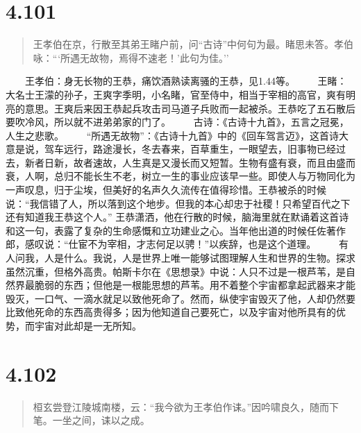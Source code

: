 \documentclass[]{book}
\begin{document}
\section{4.101}\label{section-276}

\begin{quote}
王孝伯在京，行散至其弟王睹户前，问``古诗''中何句为最。睹思未答。孝伯咏：```所遇无故物，焉得不速老！'此句为佳。''
\end{quote}

　　王孝伯：身无长物的王恭，痛饮酒熟读离骚的王恭，见1.44等。
　　王睹：大名士王濛的孙子，王爽字季明，小名睹，官至侍中，相当于宰相的高官，爽有明亮的意思。王爽后来因王恭起兵攻击司马道子兵败而一起被杀。王恭吃了五石散后要吹冷风，所以就不进弟弟家的门了。
　　古诗：《古诗十九首》，五言之冠冕，人生之悲歌。
　　``所遇无故物''：《古诗十九首》中的《回车驾言迈》，这首诗大意是说，驾车远行，路途漫长，冬去春来，百草重生，一眼望去，旧事物已经过去，新者日新，故者速故，人生真是又漫长而又短暂。生物有盛有衰，而且由盛而衰，人啊，总归不能长生不老，树立一生的事业应该早一些。即使人与万物同化为一声叹息，归于尘埃，但美好的名声久久流传在值得珍惜。王恭被杀的时候说：``我信错了人，所以落到这个地步。但我的本心却忠于社稷！只希望百代之下还有知道我王恭这个人。''
王恭潇洒，他在行散的时候，脑海里就在默诵着这首诗和这一句，表露了复杂的生命感慨和立功建业之心。当年他出道的时候任佐著作郎，感叹说：``仕宦不为宰相，才志何足以骋！''以疾辞，也是这个道理。
　　有人问我，人是什么。我说，人是世界上唯一能够试图理解人生和世界的生物。探求虽然沉重，但格外高贵。帕斯卡尔在《思想录》中说：人只不过是一根芦苇，是自然界最脆弱的东西；但他是一根能思想的芦苇。用不着整个宇宙都拿起武器来才能毁灭，一口气、一滴水就足以致他死命了。然而，纵使宇宙毁灭了他，人却仍然要比致他死命的东西高贵得多；因为他知道自己要死亡，以及宇宙对他所具有的优势，而宇宙对此却是一无所知。

\section{4.102}\label{section-277}

\begin{quote}
桓玄尝登江陵城南楼，云：``我今欲为王孝伯作诔。''因吟啸良久，随而下笔。一坐之间，诔以之成。
\end{quote}
\end{document}

